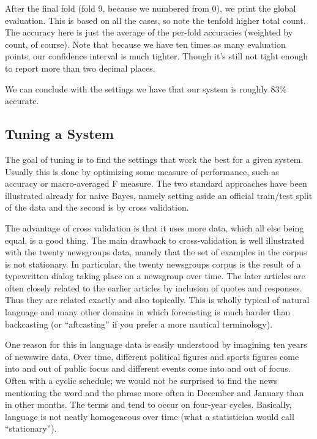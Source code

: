 After the final fold (fold 9, because we numbered from 0), we print
the global evaluation.  This is based on all the cases, so note the
tenfold higher total count.  The accuracy here is just the average of
the per-fold accuracies (weighted by count, of course).   Note
that because we have ten times as many evaluation points, our
confidence interval is much tighter.  Though it's still not tight
enough to report more than two decimal places. 

We can conclude with the settings we have that our system
is roughly 83\% accurate.

\subsection{Tuning a System}

The goal of tuning is to find the settings that work the best for a
given system.  Usually this is done by optimizing some measure of
performance, such as accuracy or macro-averaged F measure.  The
two standard approaches have been illustrated already for naive
Bayes, namely setting aside an official train/test split of the
data and the second is by cross validation.

The advantage of cross validation is that it uses more data, which all
else being equal, is a good thing.  The main drawback to
cross-validation is well illustrated with the twenty newsgroups data,
namely that the set of examples in the corpus is not stationary.  In
particular, the twenty newsgroups corpus is the result of a
typewritten dialog taking place on a newsgroup over time.  The later
articles are often closely related to the earlier articles by
inclusion of quotes and responses.  Thus they are related exactly and
also topically.  This is wholly typical of natural language and many
other domains in which forecasting is much harder than backcasting (or
``aftcasting'' if you prefer a more nautical terminology). 

One reason for this in language data is easily understood by imagining
ten years of newswire data.  Over time, different political figures
and sports figures come into and out of public focus and different
events come into and out of focus.  Often with a cyclic schedule; we
would not be surprised to find the news mentioning the word
 and the phrase  more
often in December and January than in other months.  The terms
 and  tend to
occur on four-year cycles.  Basically, language is not neatly
homogeneous over time (what a statistician would call ``stationary'').

